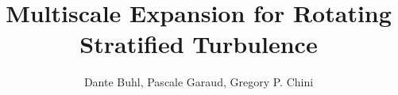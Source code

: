 \documentclass{article}
\begin{document}
\title{Multiscale Expansion for Rotating Stratified Turbulence}
\author{Dante Buhl, Pascale Garaud, Gregory P. Chini}


\newcommand{\wrms}{w_{\text{rms}}}
\newcommand{\bs}[1]{\boldsymbol{#1}}
\newcommand{\tb}[1]{\textbf{#1}}
\newcommand{\bmp}[1]{\begin{minipage}{#1\textwidth}}
\newcommand{\emp}{\end{minipage}}
\newcommand{\R}{\mathbb{R}}
\newcommand{\C}{\mathbb{C}}
\newcommand{\N}{\mathcal{N}}
\newcommand{\m}{\bs{\mu}_*}
\newcommand{\s}{\bs{\Sigma}_*}
\newcommand{\dt}{\Delta t}
\newcommand{\dx}{\Delta x}
\newcommand{\tr}[1]{\text{Tr}(#1)}
\newcommand{\Tr}[1]{\text{Tr}(#1)}
\newcommand{\Div}{\nabla \cdot}
\renewcommand{\div}{\nabla \cdot}
\newcommand{\Curl}{\nabla \times}
\newcommand{\Grad}{\nabla}
\newcommand{\grad}{\nabla}
\newcommand{\gradhs}{\nabla_{\perp S}}
\newcommand{\gradhf}{\nabla_{\perp F}}
\newcommand{\grads}{\nabla_s}
\newcommand{\gradf}{\nabla_f}
\newcommand{\xs}{x_s}
\newcommand{\x}{\bs{x}}
\newcommand{\xf}{x_f}
\newcommand{\ts}{t_s}
\newcommand{\tf}{t_f}
\newcommand{\pt}{\partial t}
\newcommand{\pz}{\partial z}
\newcommand{\uvec}{\bs{u}}
\newcommand{\uvecp}{\bs{u}_{\perp}}
\newcommand{\baruvecp}{\bar{\bs{u}}_{\perp}}
\newcommand{\brauvecp}{\bracket{\bs{u}_{\perp}}}
\newcommand{\perpuvecp}{\bs{u}'_{\perp}}
\newcommand{\bvec}{\bs{B}}
\newcommand{\nvec}{\hat{\bs{n}}}
\newcommand{\tu}{\tilde{\uvec}}
\newcommand{\B}{\bs{B}}
\newcommand{\A}{\bs{A}}
\newcommand{\jvec}{\bs{j}}
\newcommand{\bracket}[1]{\left<#1\right>}
\newcommand{\F}{\bs{F}}
\newcommand{\T}{\tilde{T}}
\newcommand{\ez}{\bs{e}_z}
\newcommand{\ex}{\bs{e}_x}
\newcommand{\ey}{\bs{e}_y}
\newcommand{\eo}{\bs{e}_{\bs{\Omega}}}
\newcommand{\ppt}[1]{\frac{\partial #1}{\partial t}}
\newcommand{\pp}[2]{\frac{\partial #1}{\partial #2}}
\newcommand{\pptwo}[2]{\frac{\partial^2 #1}{\partial #2^2}}
\newcommand{\ddtwo}[2]{\frac{d^2 #1}{d #2^2}}
\newcommand{\DDt}[1]{\frac{D #1}{D t}}
\newcommand{\ppts}[1]{\frac{\partial #1}{\partial t_s}}
\newcommand{\pptf}[1]{\frac{\partial #1}{\partial t_f}}
\newcommand{\ppz}[1]{\frac{\partial #1}{\partial z}}
\newcommand{\ddz}[1]{\frac{d #1}{d z}}
\newcommand{\ppzetas}[1]{\frac{\partial^2 #1}{\partial \zeta^2}}
\newcommand{\ppzs}[1]{\frac{\partial #1}{\partial z_s}}
\newcommand{\ppzf}[1]{\frac{\partial #1}{\partial z_f}}
\newcommand{\ppx}[1]{\frac{\partial #1}{\partial x}}
\newcommand{\ddx}[1]{\frac{d #1}{d x}}
\newcommand{\ppxi}[1]{\frac{\partial #1}{\partial x_i}}
\newcommand{\ppxj}[1]{\frac{\partial #1}{\partial x_j}}
\newcommand{\ppy}[1]{\frac{\partial #1}{\partial y}}
\newcommand{\ppzeta}[1]{\frac{\partial #1}{\partial \zeta}}
\renewcommand{\k}{\bs{k}}
\newcommand{\real}[1]{\text{Re}\left[#1\right]}
\newcommand{\bexp}{\left(\bracket{b} + \bar{b} + b'\right)}
\newcommand{\upexp}{\left(\bracket{\uvec_{\perp}} + \bar{\uvec}_{\perp} + \uvec'_{\perp}\right)}
\newcommand{\uexp}{\left(\bracket{\uvec} + \bar{\uvec} + \uvec'\right)}
\newcommand{\wexp}{\left(\bracket{w} + \bar{w} + w'\right)}
\newcommand{\pexp}{\left(\bracket{p} + \bar{p} + p'\right)}
\end{document}
